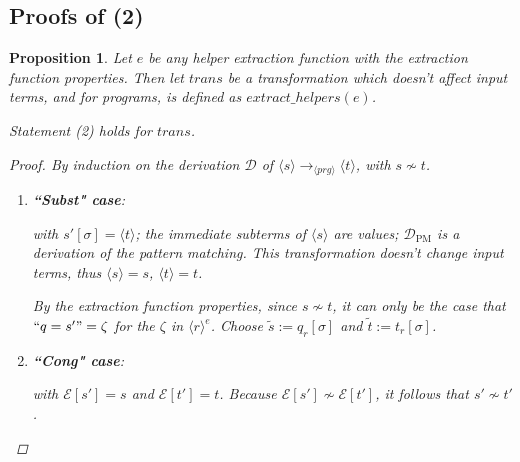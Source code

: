 \documentclass[11pt]{article} %
\newtheorem{proposition}{Proposition}
\begin{document}
\subsection{Proofs of (2)}

\begin{proposition}

Let $e$ be any helper extraction function with the extraction function properties. Then let $trans$ be a transformation which doesn't affect input terms, and for programs, is defined as $extract\_helpers(e)$.

Statement (2) holds for $trans$.

\begin{proof} By induction on the derivation $\mathcal{D}$ of $\langle s \rangle \longrightarrow_{\langle prg \rangle} \langle t \rangle$, with $s \not\sim t$.

\begin{enumerate}
\item \textbf{``Subst" case}:

\begin{prooftree}
\end{prooftree}

with $s'[\sigma] = \langle t \rangle$; the immediate subterms of $\langle s \rangle$ are values; $\mathcal{D}_{\textrm{PM}}$ is a derivation of the pattern matching. This transformation doesn't change input terms, thus $\langle s \rangle = s$, $\langle t \rangle = t$.

By the extraction function properties, since $s \not\sim t$, it can only be the case that $`` q = s' " = \zeta$ for the $\zeta$ in $\langle r \rangle^e$. Choose $\widetilde{s} := q_r[\sigma]$ and $\widetilde{t} := t_r[\sigma]$.

\item \textbf{``Cong" case}:

\begin{prooftree}
\end{prooftree}

with $\mathcal{E}[s'] = s$ and $\mathcal{E}[t'] = t$. Because $\mathcal{E}[s'] \not\sim \mathcal{E}[t']$, it follows that $s' \not\sim t'$.


\end{enumerate}
\end{proof}
\end{proposition}
\end{document}
